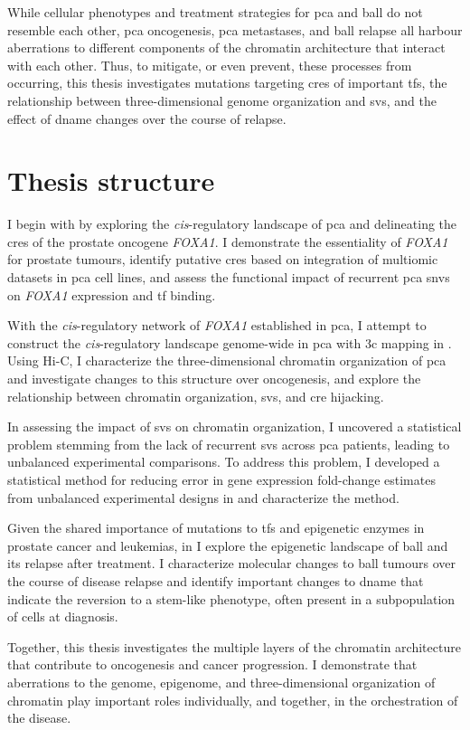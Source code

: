While cellular phenotypes and treatment strategies for \gls{pca} and \gls{ball} do not resemble each other,  \gls{pca} oncogenesis, \gls{pca} metastases, and \gls{ball} relapse all harbour aberrations to different components of the chromatin architecture that interact with each other.
Thus, to mitigate, or even prevent, these processes from occurring, this thesis investigates mutations targeting \glspl{cre} of important \glspl{tf}, the relationship between three-dimensional genome organization and \glspl{sv}, and the effect of \gls{dname} changes over the course of relapse.

\section{Thesis structure}

I begin with  by exploring the \emph{cis}-regulatory landscape of \gls{pca} and delineating the \glspl{cre} of the prostate oncogene \emph{FOXA1}.
I demonstrate the essentiality of \emph{FOXA1} for prostate tumours, identify putative \glspl{cre} based on integration of multiomic datasets in \gls{pca} cell lines, and assess the functional impact of recurrent \gls{pca} \glspl{snv} on \emph{FOXA1} expression and \gls{tf} binding.

With the \emph{cis}-regulatory network of \emph{FOXA1} established in \gls{pca}, I attempt to construct the \emph{cis}-regulatory landscape genome-wide in \gls{pca} with \gls{3c} mapping in .
Using Hi-C, I characterize the three-dimensional chromatin organization of \gls{pca} and investigate changes to this structure over oncogenesis, and explore the relationship between chromatin organization, \glspl{sv}, and \gls{cre} hijacking.

In assessing the impact of \glspl{sv} on chromatin organization, I uncovered a statistical problem stemming from the lack of recurrent \glspl{sv} across \gls{pca} patients, leading to unbalanced experimental comparisons.
To address this problem, I developed a statistical method for reducing error in gene expression fold-change estimates from unbalanced experimental designs in  and characterize the method.

Given the shared importance of mutations to \glspl{tf} and epigenetic enzymes in prostate cancer and leukemias, in  I explore the epigenetic landscape of \gls{ball} and its relapse after treatment.
I characterize molecular changes to \gls{ball} tumours over the course of disease relapse and identify important changes to \gls{dname} that indicate the reversion to a stem-like phenotype, often present in a subpopulation of cells at diagnosis.

Together, this thesis investigates the multiple layers of the chromatin architecture that contribute to oncogenesis and cancer progression.
I demonstrate that aberrations to the genome, epigenome, and three-dimensional organization of chromatin play important roles individually, and together, in the orchestration of the disease.
